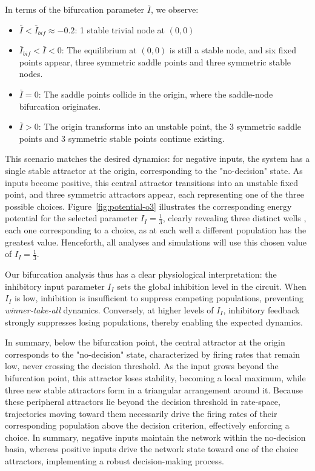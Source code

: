 \documentclass[12,twoside]{TFG-GM}
\theoremstyle{definition}
\theoremstyle{remark}
\begin{document}
In terms of the bifurcation parameter $\bar{I}$, we observe:
\begin{itemize}
  \item $\bar{I}<\bar{I}_{bif}\approx -0.2$: 
    1 stable trivial node at $(0,0)$
    \item $\bar I_{bif}<\bar{I}<0 $: 
    The equilibrium at \((0,0)\) is still a stable node, and six fixed points appear, three symmetric saddle points and three symmetric stable nodes.  
  \item $\bar{I}=0$: 
   The saddle points collide in the origin, where the saddle-node bifurcation originates.
  \item $\bar{I}>0$: 
    The origin transforms into an unstable point, the 3 symmetric saddle points and 3 symmetric stable points continue existing.
\end{itemize}
This scenario matches the desired dynamics: for negative inputs, the system has a single stable attractor at the origin, corresponding to the "no-decision" state. As inputs become positive, this central attractor transitions into an unstable fixed point, and three symmetric attractors appear, each representing one of the three possible choices. Figure~\ref{fig:potential-o3} illustrates the corresponding energy potential for the selected parameter \(I_I = \frac{1}{3}\), clearly revealing three distinct wells , each one corresponding to a choice, as at each well a different population has the greatest value. Henceforth, all analyses and simulations will use this chosen value of \(I_I = \frac{1}{3}\).

Our bifurcation analysis thus has a clear physiological interpretation: the inhibitory input parameter \(I_I\) sets the global inhibition level in the circuit. When \(I_I\) is low, inhibition is insufficient to suppress competing populations, preventing \textit{winner‐take‐all} dynamics. Conversely, at higher levels of \(I_I\), inhibitory feedback strongly suppresses losing populations, thereby enabling the expected dynamics.


In summary, below the bifurcation point, the central attractor at the origin corresponds to the "no-decision" state, characterized by firing rates that remain low, never crossing the decision threshold. As the input grows beyond the bifurcation point, this attractor loses stability, becoming a local maximum, while three new stable attractors form in a triangular arrangement around it. Because these peripheral attractors lie beyond the decision threshold in rate-space, trajectories moving toward them necessarily drive the firing rates of their corresponding population above the decision criterion, effectively enforcing a choice. In summary, negative inputs maintain the network within the no-decision basin, whereas positive inputs drive the network state toward one of the choice attractors, implementing a robust decision-making process.
\end{document}
